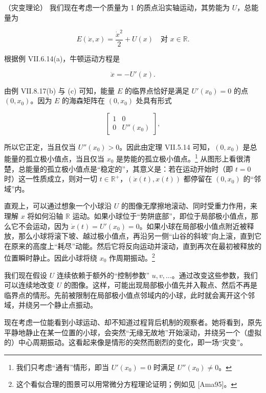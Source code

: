\begin{remark}

（灾变理论） 我们现在考虑一个质量为 1 的质点沿实轴运动，其势能为 $ U $，总能量为

\[
E(\dot{x}, x) = \frac{\dot{x}^2}{2} + U(x) \quad \text{对 } x \in \mathbb{R}.
\]

根据例 VII.6.14(a)，牛顿运动方程是

\[
\ddot{x} = -U'(x).
\]

由例 VII.8.17(b) 与 (c) 可知，能量 $ E $ 的临界点恰好是满足 $ U'(x_0) = 0 $ 的点 $ (0, x_0) $。因为 $ E $ 的海森矩阵在 $ (0, x_0) $ 处具有形式

\begin{equation*}
\begin{bmatrix} 1 & 0 \\ 0 & U''(x_0) \end{bmatrix},
\end{equation*}

所以它正定，当且仅当 $ U''(x_0) > 0 $。因此由定理 VII.5.14 可知，$ (0, x_0) $ 是总能量的孤立极小值点，当且仅当 $ x_0 $ 是势能的孤立极小值点。\footnote{我们只考虑“通有”情形，即当 $ U'(x_0) = 0 $ 时满足 $ U''(x_0) \ne 0 $。} 从图形上看很清楚，总能量的孤立极小值点是“稳定的”，其意义是：若在运动开始时（即 $ t = 0 $ 时）这一性质成立，则对一切 $ t \in \mathbb{R}^+ $，$ (\dot{x}(t), x(t)) $ 都停留在 $ (0, x_0) $ 的“邻域”内。

直观上，可以通过想象一个小球沿 $ U $ 的图像无摩擦地滚动、同时受重力作用，来理解 $ x $ 将如何沿轴 $ \mathbb{R} $ 运动。如果小球位于“势阱底部”，即位于局部极小值点，那么它不会运动，因为 $ \dot{x}(t) = U'(x_0) = 0 $。如果小球在局部极小值点附近被释放，那么小球将滚下坡、越过极小值点，再沿另一侧“山谷的斜坡”向上滚，直到它在原来的高度上“耗尽”动能。然后它将反向运动并滚动，直到再次在最初被释放的位置瞬时静止。因此小球将绕 $ x_0 $ 作周期振动。\footnote{这个看似合理的图景可以用常微分方程理论证明；例如见 [Ama95]。}


我们现在假设 $ U $ 连续依赖于额外的“控制参数” $ u, v, \ldots $。通过改变这些参数，我们可以连续地改变 $ U $ 的图像。这样，可能出现局部极小值先并入鞍点、然后不再是临界点的情形。先前被限制在局部极小值点邻域内的小球，此时就会离开这个邻域，并绕另一个静止点振动。


现在考虑一位能看到小球运动、却不知道过程背后机制的观察者。她将看到，原先平静地静止在某一位置的小球，会突然“无缘无故地”开始滚动，并绕另一个（虚拟的）中心周期振动。这看起来像是情形的突然而剧烈的变化，即一场“灾变”。


\end{remark}
